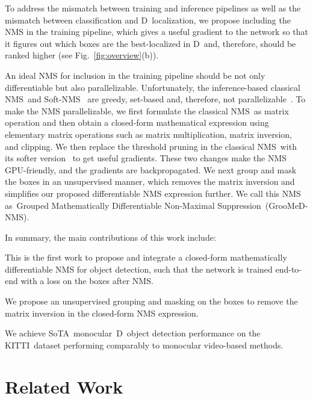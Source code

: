 \documentclass[final]{cvpr}
\newcommand{\myReferFigure}[1]{Fig.~\ref{#1}}
\newcommand{\methodName}{GrooMeD-NMS}
\newcommand{\methodNameFull}{Grouped Mathematically Differentiable Non-Maximal Suppression}
\newcommand{\threeD}{D}
\newcommand{\classicalNms}{classical NMS}
\newcommand{\softNmsCaps}{Soft-NMS}
\newcommand{\kitti}{KITTI}
\newcommand{\sota}{SoTA}
\begin{document}
    To address the mismatch between training and inference pipelines as well as the mismatch between classification and \threeD~localization, we propose including the NMS in the training pipeline, which gives a useful gradient to the network so that it figures out which boxes are the best-localized in \threeD~and, therefore, should be ranked higher (see \myReferFigure{fig:overview}(b)).
    
    An ideal NMS for inclusion in the training pipeline should be not only differentiable but also parallelizable. 
    Unfortunately, the inference-based \classicalNms~and \softNmsCaps~\cite{bodla2017soft} are greedy, set-based and, therefore, not parallelizable~\cite{prokudin2017learning}. 
    To make the NMS parallelizable, we first formulate the \classicalNms~as matrix operation and then obtain a closed-form mathematical expression using elementary matrix operations such as matrix multiplication, matrix inversion, and clipping. 
    We then replace the threshold pruning in the \classicalNms~with its softer version~\cite{bodla2017soft} to get useful gradients. These two changes make the NMS GPU-friendly, and the gradients are backpropagated.  
    We next group and mask the boxes in an unsupervised manner, which removes the matrix inversion and simplifies our proposed differentiable NMS expression further. We call this NMS as~\methodNameFull~(\methodName).

    In summary, the main contributions of this work include:
    \begin{compactitem}
        \item This is the first work to propose and integrate a closed-form mathematically differentiable NMS for object detection, such that the network is trained end-to-end with a loss on the boxes after NMS.
        \item We propose an unsupervised grouping and masking on the boxes to remove the matrix inversion in the closed-form NMS expression.
        \item We achieve \sota~monocular~\threeD~object detection performance on the \kitti~dataset performing comparably to monocular video-based methods.
    \end{compactitem}



\section{Related Work}
\end{document}
